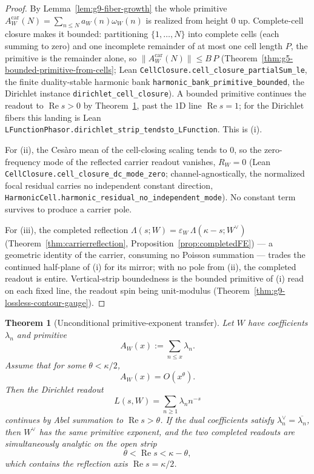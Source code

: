 \documentclass[11pt]{article}
\newtheorem{theorem}{Theorem}
\theoremstyle{definition}
\renewcommand{\Re}{\operatorname{Re}}
\begin{document}
\begin{proof}
By Lemma~\ref{lem:g9-fiber-growth} the whole primitive
\(A^{\mathrm{car}}_W(N)=\sum_{n\le N}a_W(n)\omega_W(n)\) is realized from height
\(0\) up.  Complete-cell closure makes it bounded: partitioning
\(\{1,\dots,N\}\) into complete cells (each summing to zero) and one incomplete
remainder of at most one cell length \(P\), the primitive is the remainder
alone, so \(\|A^{\mathrm{car}}_W(N)\|\le B\,P\)
(Theorem~\ref{thm:g5-bounded-primitive-from-cells}; Lean
\texttt{CellClosure.cell\_closure\_partialSum\_le}, the finite duality-stable
harmonic bank \texttt{harmonic\_bank\_primitive\_bounded}, the Dirichlet
instance \texttt{dirichlet\_cell\_closure}).  A bounded primitive continues the
readout to \(\Re s>0\) by
Theorem~\ref{thm:g9-primitive-exponent-transfer}, past the \(1\)D line
\(\Re s=1\); for the Dirichlet fibers this landing is Lean
\texttt{LFunctionPhasor.dirichlet\_strip\_tendsto\_LFunction}.  This is (i).

For (ii), the Ces\`aro mean of the cell-closing scaling tends to \(0\), so the
zero-frequency mode of the reflected carrier readout vanishes, \(R_W=0\) (Lean
\texttt{CellClosure.cell\_closure\_dc\_mode\_zero}; channel-agnostically, the
normalized focal residual carries no independent constant direction,
\texttt{HarmonicCell.harmonic\_residual\_no\_independent\_mode}).  No
constant term survives to produce a carrier pole.

For (iii), the completed reflection
\(\Lambda(s;W)=\varepsilon_W\,\Lambda(\kappa-s;W^\vee)\)
(Theorem~\ref{thm:carrierreflection}, Proposition~\ref{prop:completedFE}) ---
a geometric identity of the carrier, consuming no Poisson summation --- trades
the continued half-plane of (i) for its mirror; with no pole from (ii), the
completed readout is entire.  Vertical-strip boundedness is the bounded
primitive of (i) read on each fixed line, the readout spin being unit-modulus
(Theorem~\ref{thm:g9-lossless-contour-gauge}).
\end{proof}

\begin{theorem}[Unconditional primitive-exponent transfer]\label{thm:g9-primitive-exponent-transfer}
Let \(W\) have coefficients \(\lambda_n\) and primitive
\[
A_W(x):=\sum_{n\le x}\lambda_n.
\]
Assume that for some \(\theta<\kappa/2\),
\[
A_W(x)=O(x^\theta).
\]
Then the Dirichlet readout
\[
L(s,W)=\sum_{n\ge1}\lambda_n n^{-s}
\]
continues by Abel summation to \(\Re s>\theta\).  If the dual coefficients
satisfy \(\lambda_n^\vee=\overline{\lambda_n}\), then \(W^\vee\) has the same
primitive exponent, and the two completed readouts are simultaneously analytic
on the open strip
\[
\theta<\Re s<\kappa-\theta,
\]
which contains the reflection axis \(\Re s=\kappa/2\).
\end{theorem}
\end{document}
